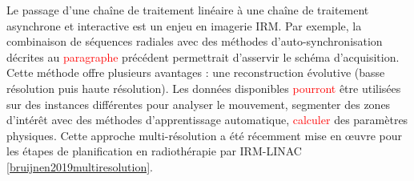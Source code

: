 Le passage d’une chaîne de traitement linéaire à une chaîne de traitement asynchrone et interactive est un enjeu en imagerie IRM. Par exemple, la combinaison de séquences radiales avec des méthodes d’auto-synchronisation décrites au \textcolor{red}{paragraphe} précédent permettrait d’asservir le schéma d’acquisition. Cette méthode offre plusieurs avantages : une reconstruction évolutive (basse résolution puis haute résolution). Les données disponibles \textcolor{red}{pourront} être utilisées sur des instances différentes pour analyser le mouvement, segmenter des zones d’intérêt avec des méthodes d’apprentissage automatique, \textcolor{red}{calculer} des paramètres physiques. Cette approche multi-résolution a été récemment mise en œuvre pour les étapes de planification en radiothérapie par IRM-\ac{LINAC} \ref{bruijnen2019multiresolution}.